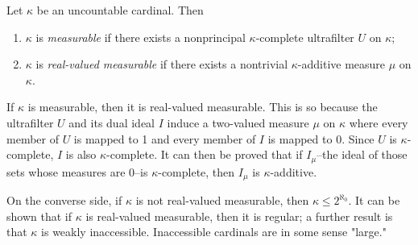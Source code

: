 \documentclass[12pt]{article}
\begin{document}
Let $\kappa$ be an uncountable cardinal. Then

\begin{enumerate}
\item $\kappa$ is \emph{measurable} if there exists a nonprincipal $\kappa$-complete ultrafilter $U$ on $\kappa$;
\item $\kappa$ is \emph{real-valued measurable} if there exists a nontrivial $\kappa$-additive measure $\mu$ on $\kappa$.
\end{enumerate}

If $\kappa$ is measurable, then it is real-valued measurable. This is so because the ultrafilter $U$ and its dual ideal $I$ induce a two-valued measure $\mu$ on $\kappa$ where every member of $U$ is mapped to 1 and every member of $I$ is mapped to 0. Since $U$ is $\kappa$-complete, $I$ is also $\kappa$-complete. It can then be proved that if $I_\mu$--the ideal of those sets whose measures are 0--is $\kappa$-complete, then $I_\mu$ is $\kappa$-additive.

On the converse side, if $\kappa$ is not real-valued measurable, then $\kappa\leq 2^{\aleph_0}$. It can be shown that if $\kappa$ is real-valued measurable, then it is regular; a further result is that $\kappa$ is weakly inaccessible. Inaccessible cardinals are in some sense "large."
\end{document}
